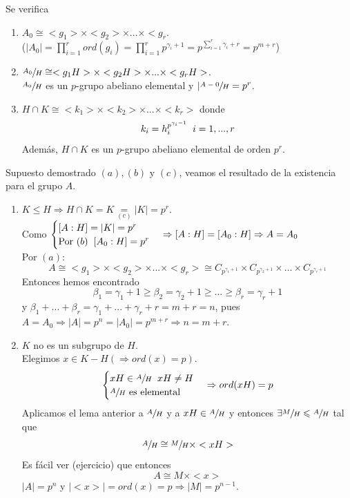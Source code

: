 \documentclass[11pt,a4paper]{article}
\begin{document}
\begin{enumerate*}
Se verifica
\begin{enumerate}[label = (\alph*)]
\item $A_{0} \cong <g_{1}> \times <g_{2}> \times ... \times <g_{r}$. \\
($|A_{0}| = \prod_{i=1}^{r} ord(g_{i}) = \prod_{i=1}^{r} p^{\gamma_{i}+1} = p^{\sum_{i=1}^{r} \gamma_{i}+r} = p^{m+r}$)
\item $\sfrac{A_{0}}{H} \cong <g_{1}H> \times <g_{2}H> \times ... \times <g_{r}H>$. \\
$\sfrac{A_{0}}{H}$ es un $p$-grupo abeliano elemental y $|\sfrac{A-{0}}{H} = p^{r}$.
\item $H \cap K \cong <k_{1}> \times <k_{2}> \times ... \times <k_{r}>$ donde 
$$k_{i} = h_{i}^{p^{\gamma_{i}-1}} \hspace{0.2cm} i = 1, ..., r$$
Además, $H \cap K$ es un $p$-grupo abeliano elemental de orden $p^{r}$.
\end{enumerate}
Supuesto demostrado $(a), (b)$ y $(c)$, veamos el resultado de la existencia para el grupo $A$.
\begin{enumerate}[label = Caso \arabic*.]
\item $K \leq H \Rightarrow H \cap K = K \underset{(c)}{=} |K| = p^{r}$. \\
Como $\begin{cases}
[A:H] = |K| = p^{r} \\
\text{Por } (b) \hspace{0.2cm} [A_{0}:H] = p^{r}
\end{cases}
\Rightarrow [A:H] = [A_{0}:H] \Rightarrow A = A_{0}$ \\
Por $(a)$:
$$A \cong <g_{1}> \times <g_{2}> \times ... \times <g_{r}> \cong C_{p^{\gamma_{1}+1}} \times C_{p^{\gamma_{2} + 1}} \times ... \times C_{p^{\gamma_{r}+1}}$$
Entonces hemos encontrado
$$\beta_{1} = \gamma_{1} + 1 \geq \beta_{2} = \gamma_{2} + 1 \geq ... \geq \beta_{r} = \gamma_{r} + 1$$
y $\beta_{1} + ... + \beta_{r} = \gamma_{1} + ... + \gamma_{r} + r = m + r = n$, pues $A = A_{0} \Rightarrow |A| = p^{n} = |A_{0}| = p^{m+r} \Rightarrow n = m+r$.
\item $K$ no es un subgrupo de $H$. \\
Elegimos $x \in K - H (\Rightarrow ord(x) = p)$.
$$\begin{cases}
xH \in \sfrac{A}{H} \hspace{0.2cm} xH \neq H \\
\sfrac{A}{H} \text{ es elemental}
\end{cases}
\Rightarrow
ord(xH) = p$$
Aplicamos el lema anterior a $\sfrac{A}{H}$ y a $xH \in \sfrac{A}{H}$ y entonces $\exists \sfrac{M}{H} \leqslant \sfrac{A}{H}$ tal que
$$\sfrac{A}{H} \cong \sfrac{M}{H} \times <xH>$$
Es fácil ver (ejercicio) que entonces
$$A \cong M \times <x>$$
$|A| = p^{n}$ y $|<x>| = ord(x) = p \Rightarrow |M| = p^{n-1}$.


\end{enumerate}
\end{enumerate*}
\end{document}
